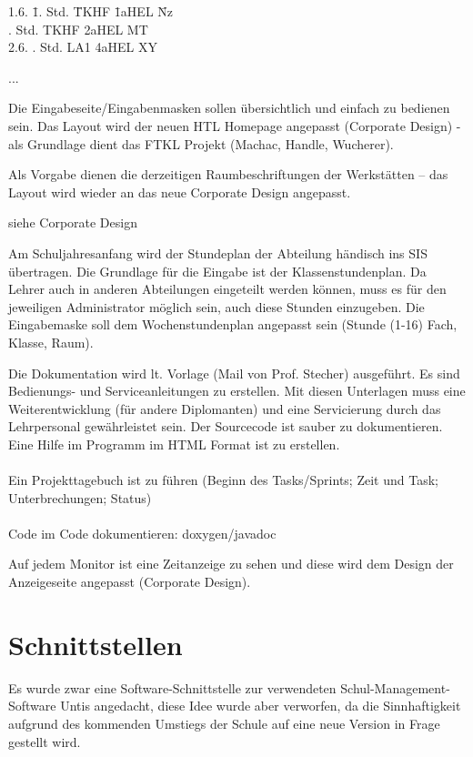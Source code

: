 \begin{description}[style=nextline]
\begin{tabbing}
1.6. \= 1. Std. \= TKHF \= 1aHEL \hspace{2em} \= Nz\\
 . Std. \> TKHF \> 2aHEL \> MT\\
2.6. . Std. \> LA1 \> 4aHEL \> XY
\end{tabbing}
		...
	\newpage
	\item[Layout]
		Die Eingabeseite/Eingabenmasken
		 sollen übersichtlich und einfach zu bedienen sein. Das Layout wird der neuen HTL Homepage angepasst (Corporate Design) - als Grundlage dient das FTKL Projekt (Machac, Handle, Wucherer).\\
		\begin{description}[style=nextline]
			\item[Stundenplandesign]
				Als Vorgabe dienen die derzeitigen Raumbeschriftungen der Werkstätten – das Layout wird wieder an das neue Corporate Design angepasst.
			\item[App­Design]
				siehe Corporate Design
			\item[Stundenplaneingabe]
				Am Schuljahresanfang wird der Stundeplan der Abteilung händisch ins SIS übertragen. Die Grundlage für die Eingabe ist der Klassenstundenplan. Da Lehrer auch in anderen Abteilungen eingeteilt werden können, muss es für den jeweiligen Administrator möglich sein, auch diese Stunden einzugeben. Die Eingabemaske soll dem Wochenstundenplan angepasst sein (Stunde (1-16) Fach, Klasse, Raum).
			\item[Dokumentation]
				Die Dokumentation wird lt. Vorlage (Mail von Prof. Stecher) ausgeführt. Es sind Bedienungs- und Serviceanleitungen zu erstellen. Mit diesen Unterlagen muss eine Weiterentwicklung (für andere Diplomanten) und eine Servicierung durch das Lehrpersonal gewährleistet sein. Der Sourcecode ist sauber zu dokumentieren. Eine Hilfe im Programm im HTML Format ist zu erstellen.\\
				\\
				Ein Projekttagebuch ist zu führen (Beginn des Tasks/Sprints; Zeit und Task; Unterbrechungen; Status)\\
				\\
				Code im Code dokumentieren: doxygen/javadoc
		\end{description}
	\item[Uhranzeige]
		Auf jedem Monitor ist eine Zeitanzeige zu sehen und diese wird dem Design der Anzeigeseite angepasst (Corporate Design).
\end{description}

\section{Schnittstellen}
Es wurde zwar eine Software-Schnittstelle zur verwendeten Schul-Management-Software Untis angedacht, diese Idee wurde aber verworfen, da die Sinnhaftigkeit aufgrund des kommenden Umstiegs der Schule auf eine neue Version in Frage gestellt wird.

